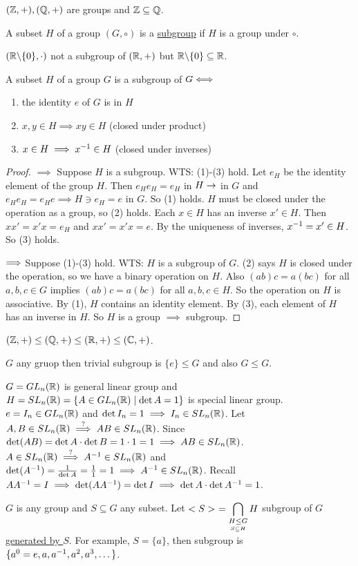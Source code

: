 \documentclass[]{article}
\begin{document}
\begin{example}
	$(\mathbb{Z},+),(\mathbb{Q},+)$ are groups and $\mathbb{Z}\subseteq\mathbb{Q}$.
\end{example}
\begin{definition}
	A subset $H$ of a group $(G,\circ)$ is a \ul{subgroup} if $H$ is a group under $\circ$.
\end{definition}
\begin{example}
	$(\mathbb{R}\backslash\{0\},\cdot)$ not a subgroup of $(\mathbb{R},+)$ but $\mathbb{R}\backslash\{0\}\subseteq\mathbb{R}$.
\end{example}
\begin{proposition}
	A subset $H$ of a group $G$ is a subgroup of $G \Longleftrightarrow$
	\begin{enumerate}
		\item the identity $e$ of $G$ is in $H$
		\item $x,y\in H \implies xy\in H$ (closed under product)
		\item $x\in H \implies x^{-1}\in H$ (closed under inverses)
	\end{enumerate}
\end{proposition}
\begin{proof}
	\ul{$\implies$} Suppose $H$ is a subgroup.
	WTS: (1)-(3) hold.
	Let $e_H$ be the identity element of the group $H$. Then $e_He_H = e_H$ in $H \rightarrow$ in $G$ and $e_H e_H = e_H e \implies H\ni e_H = e$ in $G$. So (1) holds.
	$H$ must be closed under the operation as a group, so (2) holds.
	Each $x\in H$ has an inverse $x'\in H$. Then $xx' = x'x = e_H$ and $xx' = x'x = e$. By the uniqueness of inverses, $x^{-1} = x'\in H$. So (3) holds.

	\ul{$\Longrightarrow$} Suppose (1)-(3) hold. WTS: $H$ is a subgroup of $G$.
	(2) says $H$ is closed under the operation, so we have a binary operation on $H$.
	Also $(ab)c = a(bc)$ for all $a,b,c\in G$ implies $(ab)c = a(bc)$ for all $a,b,c\in H$. So the operation on $H$ is associative.
	By (1), $H$ contains an identity element. By (3), each element of $H$ has an inverse in $H$.
	So $H$ is a group $\implies$ subgroup.
\end{proof}
\begin{example}
	$(\mathbb{Z},+)\leq (\mathbb{Q},+)\leq(\mathbb{R},+)\leq(\mathbb{C},+)$.
\end{example}
\begin{example}
	$G$ any gruop then trivial subgroup is $\{e\}\leq G$ and also $G\leq G$.
\end{example}
\begin{example}
	$G = GL_n(\mathbb{R})$ is general linear group and $H = SL_n(\mathbb{R}) = \{A\in GL_n(\mathbb{R}) \mid \det A = 1\}$ is special linear group.
	$e = I_n\in GL_n(\mathbb{R})$ and $\det I_n = 1 \implies I_n\in SL_n(\mathbb{R})$.
	Let $A,B\in SL_n(\mathbb{R}) \overset{?}{\implies} AB\in SL_n(\mathbb{R})$. Since $\det(AB) = \det A \cdot \det B = 1\cdot 1 = 1 \implies AB\in SL_n(\mathbb{R})$.
	$A\in SL_n(\mathbb{R}) \overset{?}{\implies} A^{-1}\in SL_n(\mathbb{R})$ and $\det(A^{-1}) = \frac{1}{\det A} = \frac{1}{1} = 1\implies A^{-1}\in SL_n(\mathbb{R})$. Recall $AA^{-1} = I \implies \det(AA^{-1}) = \det I \implies \det A\cdot \det A^{-1} = 1$.
\end{example}
\begin{example}
	$G$ is any group and $S\subseteq G$ any subset.
	Let $\displaystyle < S >\ = \bigcap_{\underset{S\subseteq H}{H\leq G}} H$ subgroup of $G$ \ul{generated by $S$}. For example, $S = \{a\}$, then subgroup is $\{a^0=e,a,a^{-1},a^2,a^3,\dots\}$.
\end{example}
\end{document}
